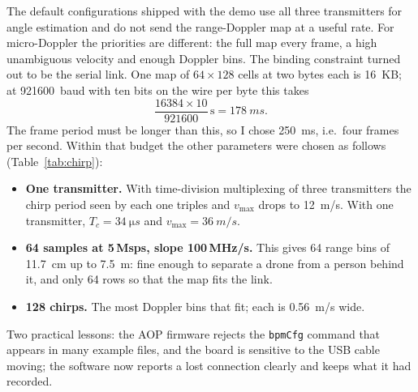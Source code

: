 \documentclass[11pt,a4paper]{article}
\newcommand{\vmax}{v_{\max}}
\begin{document}
The default configurations shipped with the demo use all three transmitters for angle estimation and do not send the range-Doppler map at a useful rate. For micro-Doppler the priorities are different: the full map every frame, a high unambiguous velocity and enough Doppler bins. The binding constraint turned out to be the serial link. One map of $64 \times 128$ cells at two bytes each is \SI{16}{KB}; at \SI{921600}{baud} with ten bits on the wire per byte this takes
\[
\frac{16384 \times 10}{921600}\,\mathrm{s} = \SI{178}{ms}.
\]
The frame period must be longer than this, so I chose \SI{250}{ms}, i.e.\ four frames per second. Within that budget the other parameters were chosen as follows (Table~\ref{tab:chirp}):
\begin{itemize}
\item \textbf{One transmitter.} With time-division multiplexing of three transmitters the chirp period seen by each one triples and $\vmax$ drops to \SI{12}{m/s}. With one transmitter, $T_c = \SI{34}{\micro s}$ and $\vmax = \SI{36}{m/s}$.
\item \textbf{64 samples at 5\,Msps, slope 100\,MHz/\textmu s.} This gives 64 range bins of \SI{11.7}{cm} up to \SI{7.5}{m}: fine enough to separate a drone from a person behind it, and only 64 rows so that the map fits the link.
\item \textbf{128 chirps.} The most Doppler bins that fit; each is \SI{0.56}{m/s} wide.
\end{itemize}
Two practical lessons: the AOP firmware rejects the \texttt{bpmCfg} command that appears in many example files, and the board is sensitive to the USB cable moving; the software now reports a lost connection clearly and keeps what it had recorded.
\end{document}
